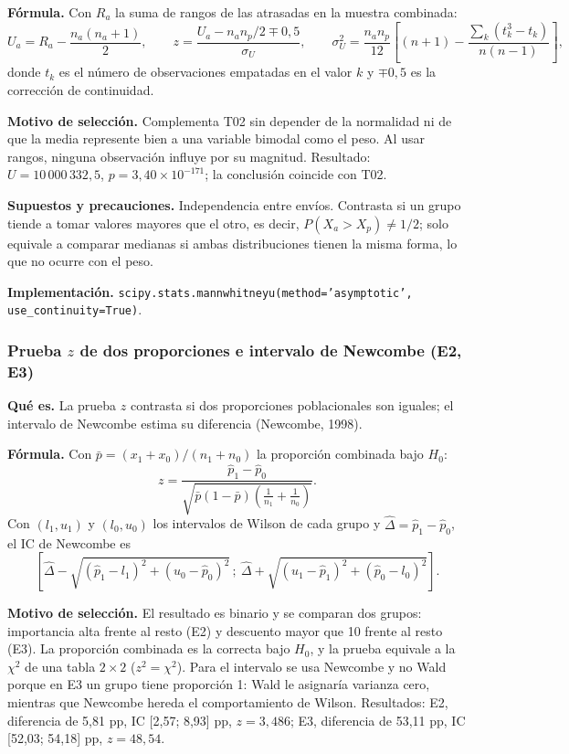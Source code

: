 \documentclass[10pt,a4paper]{article}
\begin{document}
\textbf{Fórmula.} Con $R_a$ la suma de rangos de las atrasadas en la muestra combinada:
\[
U_a=R_a-\frac{n_a(n_a+1)}{2},\qquad
z=\frac{U_a-n_an_p/2\mp0{,}5}{\sigma_U},\qquad
\sigma_U^2=\frac{n_an_p}{12}\left[(n+1)-\frac{\sum_k(t_k^3-t_k)}{n(n-1)}\right],
\]
donde $t_k$ es el número de observaciones empatadas en el valor $k$ y $\mp0{,}5$ es la corrección de continuidad.

\textbf{Motivo de selección.} Complementa T02 sin depender de la normalidad ni de que la media represente bien a una variable bimodal como el peso. Al usar rangos, ninguna observación influye por su magnitud. Resultado: $U=10\,000\,332{,}5$, $p=3{,}40\times10^{-171}$; la conclusión coincide con T02.

\textbf{Supuestos y precauciones.} Independencia entre envíos. Contrasta si un grupo tiende a tomar valores mayores que el otro, es decir, $P(X_a>X_p)\ne1/2$; solo equivale a comparar medianas si ambas distribuciones tienen la misma forma, lo que no ocurre con el peso.

\textbf{Implementación.} \texttt{scipy.stats.mannwhitneyu(method='asymptotic', use\_continuity=True)}.

\subsubsection{Prueba \texorpdfstring{$z$}{z} de dos proporciones e intervalo de Newcombe (E2, E3)}
\textbf{Qué es.} La prueba $z$ contrasta si dos proporciones poblacionales son iguales; el intervalo de Newcombe estima su diferencia (Newcombe, 1998).

\textbf{Fórmula.} Con $\bar p=(x_1+x_0)/(n_1+n_0)$ la proporción combinada bajo $H_0$:
\[
z=\frac{\hat p_1-\hat p_0}{\sqrt{\bar p(1-\bar p)\left(\frac1{n_1}+\frac1{n_0}\right)}}.
\]
Con $(l_1,u_1)$ y $(l_0,u_0)$ los intervalos de Wilson de cada grupo y $\hat\Delta=\hat p_1-\hat p_0$, el IC de Newcombe es
\[
\left[\hat\Delta-\sqrt{(\hat p_1-l_1)^2+(u_0-\hat p_0)^2}\,;\ \hat\Delta+\sqrt{(u_1-\hat p_1)^2+(\hat p_0-l_0)^2}\right].
\]

\textbf{Motivo de selección.} El resultado es binario y se comparan dos grupos: importancia alta frente al resto (E2) y descuento mayor que 10 frente al resto (E3). La proporción combinada es la correcta bajo $H_0$, y la prueba equivale a la $\chi^2$ de una tabla $2\times2$ ($z^2=\chi^2$). Para el intervalo se usa Newcombe y no Wald porque en E3 un grupo tiene proporción 1: Wald le asignaría varianza cero, mientras que Newcombe hereda el comportamiento de Wilson. Resultados: E2, diferencia de 5,81 pp, IC [2,57; 8,93] pp, $z=3{,}486$; E3, diferencia de 53,11 pp, IC [52,03; 54,18] pp, $z=48{,}54$.
\end{document}
